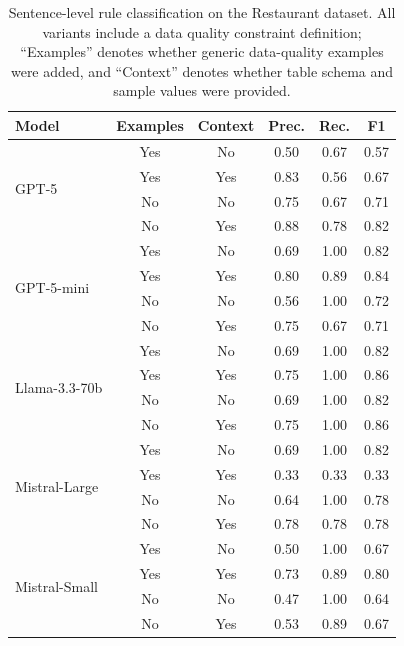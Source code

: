 \begin{table}[htbp]
\centering
\small
\caption{Sentence-level rule classification on the Restaurant dataset. All variants include a data quality constraint definition; ``Examples'' denotes whether generic data-quality examples were added, and ``Context'' denotes whether table schema and sample values were provided.}
\label{tab:classification_results_restaurant}
\begin{tabular}{@{}lccccc@{}}
\toprule
\textbf{Model} & \textbf{Examples} & \textbf{Context} & \textbf{Prec.} & \textbf{Rec.} & \textbf{F1} \\
\midrule
\multirow{4}{*}{GPT-5} & Yes & No & 0.50 & 0.67 & 0.57 \\
 & Yes & Yes & 0.83 & 0.56 & 0.67 \\
 & No & No & 0.75 & 0.67 & 0.71 \\
 & No & Yes & 0.88 & 0.78 & 0.82 \\
\cmidrule(lr){1-6}
\multirow{4}{*}{GPT-5-mini} & Yes & No & 0.69 & 1.00 & 0.82 \\
 & Yes & Yes & 0.80 & 0.89 & 0.84 \\
 & No & No & 0.56 & 1.00 & 0.72 \\
 & No & Yes & 0.75 & 0.67 & 0.71 \\
\cmidrule(lr){1-6}
\multirow{4}{*}{Llama-3.3-70b} & Yes & No & 0.69 & 1.00 & 0.82 \\
 & Yes & Yes & 0.75 & 1.00 & 0.86 \\
 & No & No & 0.69 & 1.00 & 0.82 \\
 & No & Yes & 0.75 & 1.00 & 0.86 \\
\cmidrule(lr){1-6}
\multirow{4}{*}{Mistral-Large} & Yes & No & 0.69 & 1.00 & 0.82 \\
 & Yes & Yes & 0.33 & 0.33 & 0.33 \\
 & No & No & 0.64 & 1.00 & 0.78 \\
 & No & Yes & 0.78 & 0.78 & 0.78 \\
\cmidrule(lr){1-6}
\multirow{4}{*}{Mistral-Small} & Yes & No & 0.50 & 1.00 & 0.67 \\
 & Yes & Yes & 0.73 & 0.89 & 0.80 \\
 & No & No & 0.47 & 1.00 & 0.64 \\
 & No & Yes & 0.53 & 0.89 & 0.67 \\
\bottomrule
\end{tabular}
\end{table}